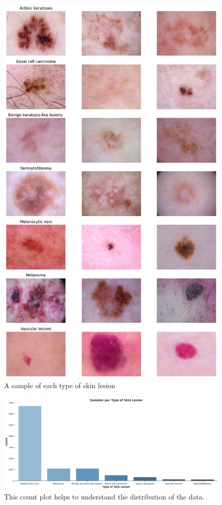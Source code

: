     \begin{figure}[htbp]
    \begin{center}
    \includegraphics[width=12cm]{./chapter-05-our-contribution/2.png}
    \end{center}
    \caption{A sample of each type of skin lesion ~\cite{JULIANA2021}}
    \label{fig:dataset}
    \end{figure}

    

    \begin{figure}[htbp]
    \begin{center}
    \includegraphics[width=15cm]{./chapter-05-our-contribution/5.png}
    \end{center}
    \caption{This count plot helps to understand the distribution of the data. ~\cite{JULIANA2021}}
    \label{fig:distribution}
    \end{figure}

